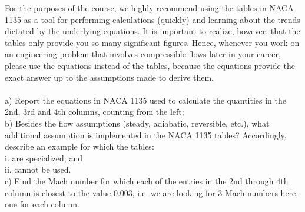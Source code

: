 \documentclass[12pt]{exam}
\begin{document}
\begin{questions}
\newpage 
\begin{question}
For the purposes of the course, we highly recommend using the tables in NACA 1135 as a tool for
performing calculations (quickly) and learning about the trends dictated by the underlying equations.
It is important to realize, however, that the tables only provide you so many significant figures. Hence,
whenever you work on an engineering problem that involves compressible flows later in your career,
please use the equations instead of the tables, because the equations provide the exact answer up to
the assumptions made to derive them.\\ 
\\
a) Report the equations in NACA 1135 used to calculate the quantities in the 2nd, 3rd and 4th
columns, counting from the left;\\
b) Besides the flow assumptions (steady, adiabatic, reversible, etc.), what additional assumption
is implemented in the NACA 1135 tables? Accordingly, describe an example for which the
tables:\\
\indent i. are specialized; and\\
\indent ii. cannot be used.\\
c) Find the Mach number for which each of the entries in the 2nd through 4th column is closest to
the value 0.003, i.e. we are looking for 3 Mach numbers here, one for each column. 
\end{question}
\begin{solutionorbox}[\stretch{1}]
\end{solutionorbox}


\end{questions}
\end{document}
